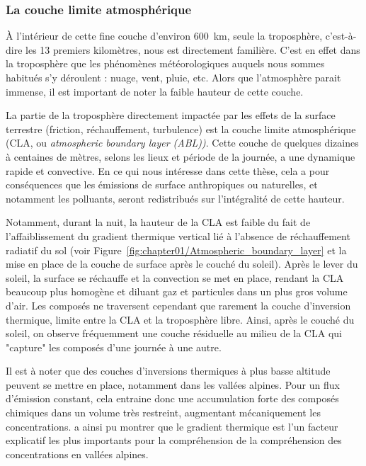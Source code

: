 \subsubsection{La couche limite atmosphérique}%
\label{sub:la_couche_limite_atmospherique}

À l'intérieur de cette fine couche d'environ \SI{600}{km}, seule la troposphère,
c'est-à-dire les 13 premiers kilomètres, nous est directement familière. C'est en effet
dans la troposphère que les phénomènes météorologiques auquels nous sommes habitués s'y
déroulent : nuage, vent, pluie, etc. Alors que l'atmosphère parait immense, il est
important de noter la faible hauteur de cette couche.

La partie de la troposphère directement impactée par les effets de la surface terrestre
(friction, réchauffement, turbulence) est la couche limite atmosphérique (CLA, ou
\textit{atmospheric boundary layer (ABL))}. Cette couche de quelques dizaines à centaines
de mètres, selons les lieux et période de la journée, a une dynamique rapide et
convective. En ce qui nous intéresse dans cette thèse, cela a pour conséquences que les
émissions de surface anthropiques ou naturelles, et notamment les polluants, seront
redistribués sur l'intégralité de cette hauteur.

Notamment, durant la nuit, la hauteur de la CLA est faible du fait de l'affaiblissement du
gradient thermique vertical lié à l'absence de réchauffement radiatif du sol (voir
Figure~\ref{fig:chapter01/Atmospheric_boundary_layer} et la mise en place de la couche de
surface après le couché du soleil). Après le lever du soleil, la surface se réchauffe et la
convection se met en place, rendant la CLA beaucoup plus homogène et diluant gaz et
particules dans un plus gros volume d'air. Les composés ne traversent cependant que
rarement la couche d'inversion thermique, limite entre la CLA et la troposphère libre.
Ainsi, après le couché du soleil, on observe fréquemment une couche résiduelle au milieu de
la CLA qui "capture" les composés d'une journée à une autre.

Il est à noter que des couches d'inversions thermiques à plus basse altitude peuvent se
mettre en place, notamment dans les vallées alpines. Pour un flux d'émission
constant, cela entraine donc une accumulation forte des composés chimiques dans un volume
très restreint, augmentant mécaniquement les concentrations.
\textcite{allardQualite2018} a ainsi pu montrer que le gradient thermique est l'un facteur
explicatif les plus importants pour la compréhension de la compréhension des
concentrations en vallées alpines.

